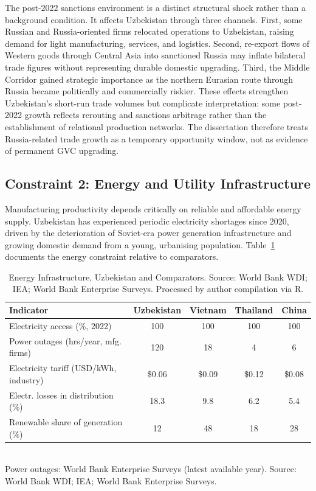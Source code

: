 The post-2022 sanctions environment is a distinct structural shock rather than a background condition. It affects Uzbekistan through three channels. First, some Russian and Russia-oriented firms relocated operations to Uzbekistan, raising demand for light manufacturing, services, and logistics. Second, re-export flows of Western goods through Central Asia into sanctioned Russia may inflate bilateral trade figures without representing durable domestic upgrading. Third, the Middle Corridor gained strategic importance as the northern Eurasian route through Russia became politically and commercially riskier. These effects strengthen Uzbekistan's short-run trade volumes but complicate interpretation: some post-2022 growth reflects rerouting and sanctions arbitrage rather than the establishment of relational production networks. The dissertation therefore treats Russia-related trade growth as a temporary opportunity window, not as evidence of permanent GVC upgrading.

\subsection{Constraint 2: Energy and Utility Infrastructure}

Manufacturing productivity depends critically on reliable and affordable energy supply. Uzbekistan has experienced periodic electricity shortages since 2020, driven by the deterioration of Soviet-era power generation infrastructure and growing domestic demand from a young, urbanising population. Table~\ref{tab:energy} documents the energy constraint relative to comparators.

\begin{table}[H]
 \centering
 \caption{Energy Infrastructure, Uzbekistan and Comparators. Source: World Bank WDI; IEA; World Bank Enterprise Surveys. Processed by author compilation via R.}
 \label{tab:energy}
 \small
 \begin{tabular}{@{}lcccc@{}}
 \toprule
 Indicator & Uzbekistan & Vietnam & Thailand & China \\
 \midrule
 Electricity access (\%, 2022) & 100 & 100 & 100 & 100 \\
 Power outages (hrs/year, mfg. firms) & 120 & 18 & 4 & 6 \\
 Electricity tariff (USD/kWh, industry) & \$0.06 & \$0.09 & \$0.12 & \$0.08 \\
 Electr. losses in distribution (\%) & 18.3 & 9.8 & 6.2 & 5.4 \\
 Renewable share of generation (\%) & 12 & 48 & 18 & 28 \\
 \bottomrule
 \end{tabular}
 \\\smallskip
 \small Power outages: World Bank Enterprise Surveys (latest available year). Source: World Bank WDI; IEA; World Bank Enterprise Surveys.
\end{table}

